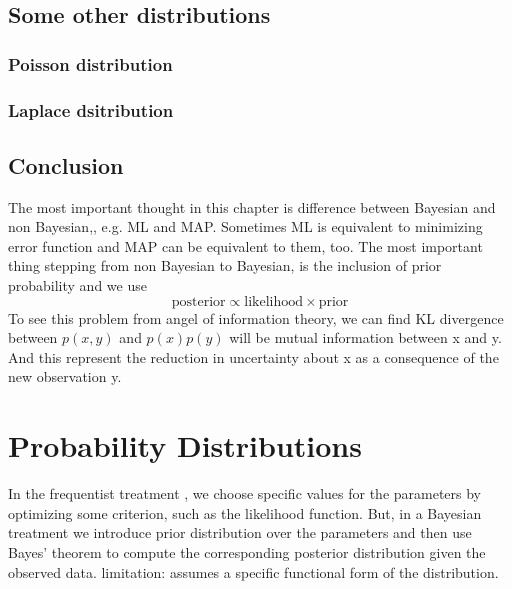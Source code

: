 \documentclass[a4paper]{book}
\begin{document}
\subsection{Some other distributions}
\subsubsection{Poisson distribution}
\subsubsection{Laplace dsitribution}

\subsection{Conclusion}
The most important thought in this chapter is difference between Bayesian and non Bayesian,, e.g. ML and MAP.  Sometimes ML is equivalent to minimizing error function and MAP can be equivalent to them, too.\newline
The most important thing stepping from non Bayesian to Bayesian, is the inclusion of prior probability and we use $$\mathrm{posterior} \propto \mathrm{likelihood} \times\mathrm{prior}$$
To see this problem from angel of information theory, we can find KL divergence between $p(x,y)$ and $p(x)p(y)$ will be mutual information between x and y. And this represent the reduction in uncertainty about x as a consequence of the new observation y.

\section{Probability Distributions}
In the frequentist treatment , we choose specific values for the parameters by optimizing some criterion, such as the likelihood function. But, in a Bayesian treatment we introduce prior distribution over the parameters and then use Bayes' theorem to compute the corresponding posterior distribution given the observed data.\newline
limitation:  assumes a specific functional form of the distribution.
\end{document}
